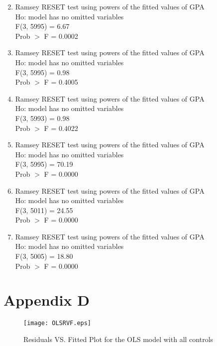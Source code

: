 \documentclass[11pt]{article}
\begin{document}
\begin{enumerate}
\setcounter{enumi}{1}

\item
Ramsey RESET test using powers of the fitted values of GPA \\
       \indent Ho:  model has no omitted variables \\
                \indent F(3, 5995) =      6.67 \\
                   \indent Prob $>$ F =      0.0002 \\
\item
\noindent Ramsey RESET test using powers of the fitted values of GPA \\
      \indent Ho:  model has no omitted variables \\
                \indent F(3, 5995) =      0.98 \\
                   \indent Prob $>$ F =      0.4005 \\

\item
\noindent Ramsey RESET test using powers of the fitted values of GPA \\
       \indent Ho:  model has no omitted variables \\
              \indent  F(3, 5993) =      0.98 \\
             \indent     Prob $>$ F =      0.4022 \\

\item
\noindent Ramsey RESET test using powers of the fitted values of GPA \\
   \indent    Ho:  model has no omitted variables \\
          \indent      F(3, 5995) =     70.19 \\
           \indent       Prob $>$ F =      0.0000 \\

\item
\noindent Ramsey RESET test using powers of the fitted values of GPA \\
      \indent Ho:  model has no omitted variables \\
           \indent     F(3, 5011) =     24.55 \\
             \indent     Prob $>$ F =      0.0000 \\

\item
\noindent Ramsey RESET test using powers of the fitted values of GPA \\
    \indent   Ho:  model has no omitted variables \\
          \indent      F(3, 5005) =     18.80 \\
            \indent      Prob $>$ F =      0.0000 \\

\end{enumerate}


\newpage

\section*{Appendix D}
\begin{figure}[h!]
    \centering
    \texttt{[image: OLSRVF.eps]}
    \caption{Residuals VS. Fitted Plot for the OLS model with all controls}
    \label{fig:OLSRVF}
\end{figure}

\newpage
\end{document}
